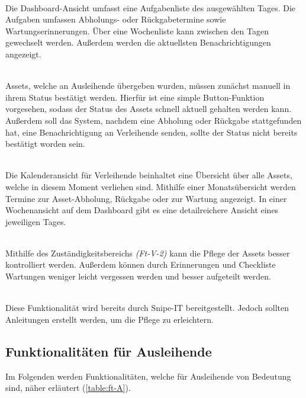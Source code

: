 {\sffamily\color{maincolor}{Ft-V-1 | Dashboard }}\\
Die Dashboard-Ansicht umfasst eine Aufgabenliste des ausgewählten Tages. Die
Aufgaben umfassen Abholungs- oder Rückgabetermine sowie Wartungserinnerungen.
Über eine Wochenliste kann zwischen den Tagen gewechselt werden. Außerdem werden
die aktuellsten Benachrichtigungen angezeigt.

    {\sffamily\color{maincolor}{Ft-V-2 | Bearbeiten des Assetstatus }}\\
Assets, welche an Ausleihende übergeben wurden, müssen zunächst manuell in ihrem
Status bestätigt werden. Hierfür ist eine simple Button-Funktion vorgesehen,
sodass der Status des Assets schnell aktuell gehalten werden kann. Außerdem soll
das System, nachdem eine Abholung oder Rückgabe stattgefunden hat, eine
Benachrichtigung an Verleihende senden, sollte der Status nicht bereits
bestätigt worden sein.

    {\sffamily\color{maincolor}{Ft-B-4 | Kalenderansicht für Verleihende}}\\
Die Kalenderansicht für Verleihende beinhaltet eine Übersicht über alle Assets,
welche in diesem Moment verliehen sind. Mithilfe einer Monatsübersicht werden
Termine zur Asset-Abholung, Rückgabe oder zur Wartung angezeigt. In einer
Wochenansicht auf dem Dashboard gibt es eine detailreichere Ansicht eines
jeweiligen Tages.


    {\sffamily\color{maincolor}{Ft-V-3 | Pflege von Assets   }}\\
Mithilfe des Zuständigkeitsbereichs \textit{(Ft-V-2)} kann die Pflege der Assets
besser kontrolliert werden. Außerdem können durch Erinnerungen und Checkliste
Wartungen weniger leicht vergessen werden und besser aufgeteilt werden.


    {\sffamily\color{maincolor}{Ft-V-4 | Pflege der Datenbank }}\\
Diese Funktionalität wird bereits durch Snipe-IT bereitgestellt. Jedoch sollten
Anleitungen erstellt werden, um die Pflege zu erleichtern. 

\subsection{Funktionalitäten für Ausleihende}
Im Folgenden werden Funktionalitäten, welche für Ausleihende von Bedeutung sind,
näher erläutert (\ref{table:ft-A}).

